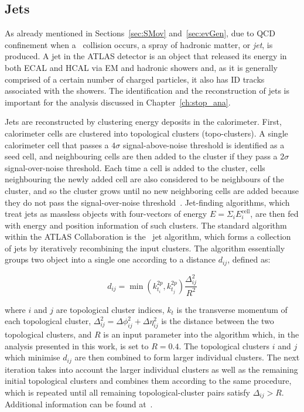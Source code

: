 		\subsection*{Jets}

			As already mentioned in Sections~\ref{sec:SMov} and~\ref{sec:evGen}, due to \ac{QCD} confinement when a \pp\ collision occurs, a spray of hadronic matter, or \emph{jet}, is produced. A jet in the \ac{ATLAS} detector is an object that released its energy in both \ac{ECAL} and \ac{HCAL} via \ac{EM} and hadronic showers and, as it is generally comprised of a certain number of charged particles, it also has \ac{ID} tracks associated with the showers. The identification and the reconstruction of jets is important for the analysis discussed in Chapter~\ref{ch:stop_ana}.

			Jets are reconstructed by clustering energy deposits in the calorimeter. First, calorimeter cells are clustered into topological clusters (topo-clusters)\cite{LamplAlgo2008,Aad:2016upy}. A single calorimeter cell that passes a $4\sigma$ signal-above-noise threshold is identified as a seed cell, and neighbouring cells are then added to the cluster if they pass a $2\sigma$ signal-over-noise threshold. Each time a cell is added to the cluster, cells neighbouring the newly added cell are also considered to be neighbours of the cluster, and so the cluster grows until no new neighboring cells are added because they do not pass the signal-over-noise threshold~\cite{ATLASJetReco2010}. 
			Jet-finding algorithms, which treat jets as massless objects with four-vectors of energy $E = \Sigma_i E^{\mathrm{cell}}_i$, are then fed with energy and position information of such clusters. The standard algorithm within the \ac{ATLAS} Collaboration is the \antikt\ jet algorithm, which forms a collection of jets by iteratively recombining the input clusters. The algorithm essentially groups two object into a single one according to a distance $d_{ij}$, defined as: 

			\begin{equation}
				d_{ij} = \min \left ( k_{t_{i}}^{2p}, k_{t_{j}}^{2p}\right ) \frac{\Delta_{ij}^2}{R^2}
			\label{eq:dij}
			\end{equation}
			
			\noindent where $i$ and $j$ are topological cluster indices, $k_t$ is the transverse momentum of each topological cluster, $\Delta_{ij}^2 = \Delta \phi_{ij}^2 + \Delta \eta_{ij}^2 $ is the distance between the two topological clusters, and $R$ is an input parameter into the algorithm which, in the analysis presented in this work, is set to $R = 0.4$. The topological clusters $i$ and $j$ which minimise $d_{ij}$ are then combined to form larger individual clusters. The next iteration takes into account the larger individual clusters as well as the remaining initial topological clusters and combines them according to the same procedure, which is repeated until all remaining topological-cluster pairs satisfy $\Delta_{ij}> R$. Additional information can be found at~\cite{Antikt2008}.

